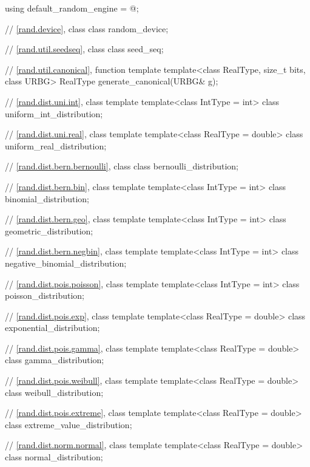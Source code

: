 \begin{codeblock}
{  using default_random_engine = @\seebelow@;

  // \ref{rand.device}, class 
  class random_device;

  // \ref{rand.util.seedseq}, class 
  class seed_seq;

  // \ref{rand.util.canonical}, function template 
  template<class RealType, size_t bits, class URBG>
    RealType generate_canonical(URBG& g);

  // \ref{rand.dist.uni.int}, class template 
  template<class IntType = int>
    class uniform_int_distribution;

  // \ref{rand.dist.uni.real}, class template 
  template<class RealType = double>
    class uniform_real_distribution;

  // \ref{rand.dist.bern.bernoulli}, class 
  class bernoulli_distribution;

  // \ref{rand.dist.bern.bin}, class template 
  template<class IntType = int>
    class binomial_distribution;

  // \ref{rand.dist.bern.geo}, class template 
  template<class IntType = int>
    class geometric_distribution;

  // \ref{rand.dist.bern.negbin}, class template 
  template<class IntType = int>
    class negative_binomial_distribution;

  // \ref{rand.dist.pois.poisson}, class template 
  template<class IntType = int>
    class poisson_distribution;

  // \ref{rand.dist.pois.exp}, class template 
  template<class RealType = double>
    class exponential_distribution;

  // \ref{rand.dist.pois.gamma}, class template 
  template<class RealType = double>
    class gamma_distribution;

  // \ref{rand.dist.pois.weibull}, class template 
  template<class RealType = double>
    class weibull_distribution;

  // \ref{rand.dist.pois.extreme}, class template 
  template<class RealType = double>
    class extreme_value_distribution;

  // \ref{rand.dist.norm.normal}, class template 
  template<class RealType = double>
    class normal_distribution;

}
\end{codeblock}

